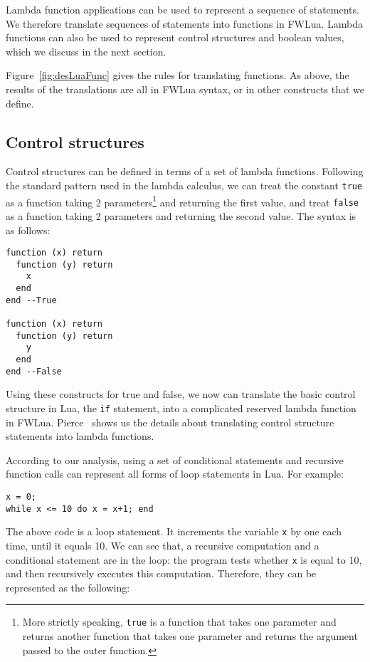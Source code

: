 
Lambda function applications can be used to represent a sequence of statements. We therefore translate sequences of statements into functions in FWLua. Lambda functions can also be used to represent control structures and boolean values, which we discuss in the next section.

Figure~\ref{fig:desLuaFunc} gives the rules for translating functions. As above, the results of the translations are all in FWLua syntax, or in other constructs that we define.

\subsection{Control structures}
Control structures can be defined in terms of a set of lambda functions. 
Following the standard pattern used in the lambda calculus, we can treat the constant {\tt true} as a function taking 2 parameters\footnote{More strictly speaking, {\tt true} is a function that takes one parameter and returns another function that takes one parameter and returns the argument passed to the outer function.} and returning the first value, and treat {\tt false} as a function taking 2 parameters and returning the second value. The syntax is as follows:

\begin{verbatim}
function (x) return 
  function (y) return 
    x
  end
end --True

function (x) return 
  function (y) return 
    y
  end
end --False
\end{verbatim}

Using these constructs for true and false, we now can translate the basic control structure in Lua, the {\tt if} statement, into a complicated reserved lambda function in FWLua. Pierce~\cite{TAPL} shows us the details about translating control structure statements into lambda functions.

According to our analysis, using a set of conditional statements and recursive function calls can represent all forms of loop statements in Lua. For example:

\begin{verbatim}
x = 0;
while x <= 10 do x = x+1; end
\end{verbatim}

The above code is a loop statement. It increments the variable {\tt x} by one each time, until it equals 10. We can see that, a recursive computation and a conditional statement are in the loop: the program tests whether {\tt x} is equal to 10, and then recursively executes this computation. Therefore, they can be represented as the following:

